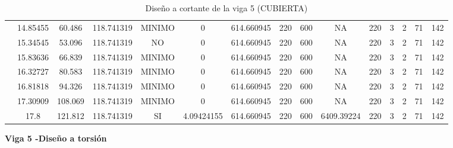 \begin{table}[H]
{\begin{tabular}{|c|c|c|c|c|c|c|c|c|c|c|c|c|c|c|}
\cline{2-15}    & 14.85455 & 60.486 & 118.741319 & MINIMO & 0   & 614.660945 & 220 & 600 & NA  & 220 & 3   & 2   & 71  & 142 \bigstrut\\
\cline{2-15}    & 15.34545 & 53.096 & 118.741319 & NO  & 0   & 614.660945 & 220 & 600 & NA  & 220 & 3   & 2   & 71  & 142 \bigstrut\\
\cline{2-15}    & 15.83636 & 66.839 & 118.741319 & MINIMO & 0   & 614.660945 & 220 & 600 & NA  & 220 & 3   & 2   & 71  & 142 \bigstrut\\
\cline{2-15}    & 16.32727 & 80.583 & 118.741319 & MINIMO & 0   & 614.660945 & 220 & 600 & NA  & 220 & 3   & 2   & 71  & 142 \bigstrut\\
\cline{2-15}    & 16.81818 & 94.326 & 118.741319 & MINIMO & 0   & 614.660945 & 220 & 600 & NA  & 220 & 3   & 2   & 71  & 142 \bigstrut\\
\cline{2-15}    & 17.30909 & 108.069 & 118.741319 & MINIMO & 0   & 614.660945 & 220 & 600 & NA  & 220 & 3   & 2   & 71  & 142 \bigstrut\\
\cline{2-15}    & 17.8 & 121.812 & 118.741319 & SI  & 4.09424155 & 614.660945 & 220 & 600 & 6409.39224 & 220 & 3   & 2   & 71  & 142 \bigstrut\\
\hline
\end{tabular}%



  
 
  }%
    \caption{Diseño a cortante de la viga 5 (CUBIERTA) }
  \label{tab:C VG5 CUB }%
\end{table}%
\newpage
\textbf{Viga 5 -Diseño a torsión}
